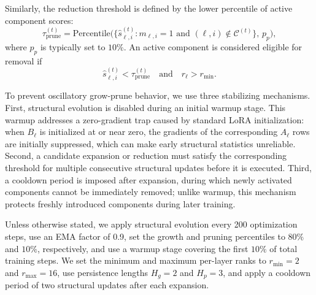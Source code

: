 \documentclass{article}
\begin{document}
Similarly, the reduction threshold is defined by the lower percentile of active component scores:
\begin{equation}
    \tau_{\mathrm{prune}}^{(t)}
    =
    \mathrm{Percentile}\bigl(\{\hat{s}_{\ell,i}^{(t)}: m_{\ell,i}=1 \text{ and } (\ell,i)\notin \mathcal{C}^{(t)}\},\, p_p\bigr),
\end{equation}
where $p_p$ is typically set to $10\%$. An active component is considered eligible for removal if
\begin{equation}
    \hat{s}_{\ell,i}^{(t)} < \tau_{\mathrm{prune}}^{(t)}
    \quad\text{and}\quad
    r_\ell > r_{\min}.
\end{equation}

To prevent oscillatory grow-prune behavior, we use three stabilizing mechanisms. First, structural evolution is disabled during an initial warmup stage. This warmup addresses a zero-gradient trap caused by standard LoRA initialization: when $B_\ell$ is initialized at or near zero, the gradients of the corresponding $A_\ell$ rows are initially suppressed, which can make early structural statistics unreliable. Second, a candidate expansion or reduction must satisfy the corresponding threshold for multiple consecutive structural updates before it is executed. Third, a cooldown period is imposed after expansion, during which newly activated components cannot be immediately removed; unlike warmup, this mechanism protects freshly introduced components during later training.

Unless otherwise stated, we apply structural evolution every 200 optimization steps, use an EMA factor of 0.9, set the growth and pruning percentiles to $80\%$ and $10\%$, respectively, and use a warmup stage covering the first $10\%$ of total training steps. We set the minimum and maximum per-layer ranks to $r_{\min}=2$ and $r_{\max}=16$, use persistence lengths $H_g=2$ and $H_p=3$, and apply a cooldown period of two structural updates after each expansion.
\end{document}
